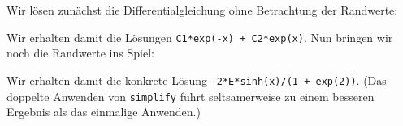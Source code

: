 \section{}

Wir lösen zunächst die Differentialgleichung ohne Betrachtung der Randwerte:



Wir erhalten damit die Lösungen \texttt{C1*exp(-x) + C2*exp(x)}.
Nun bringen wir noch die Randwerte ins Spiel:



Wir erhalten damit die konkrete Lösung \texttt{-2*E*sinh(x)/(1 + exp(2))}.
(Das doppelte Anwenden von \texttt{simplify} führt seltsamerweise zu einem besseren Ergebnis als das einmalige Anwenden.)
